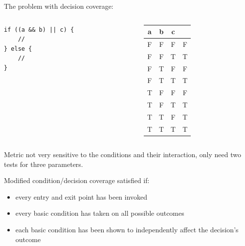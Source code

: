 \documentclass[xcolor = {dvipsnames, table}, aspectratio=169]{beamer}
\begin{document}
\newcommand \rowhl  {\rowcolor{Cyan!20}}
\newcommand \cellhl {\cellcolor{Cyan!20}}

\begin{frame}[fragile]
    The problem with decision coverage:
    \begin{columns}
        \begin{column}{0.5\textwidth}
            \begin{lstlisting}
if ((a && b) || c) {
    //
} else {
    //
}
            \end{lstlisting}
        \end{column}

        \begin{column}{0.5\textwidth}
            \begin{tabular}{c c c | c}
                        a & b & c \\
                        \hline
                \rowhl  F & F & F & F \\
                \rowhl  F & F & T & T \\
                        F & T & F & F \\
                        F & T & T & T \\
                        T & F & F & F \\
                        T & F & T & T \\
                        T & T & F & T \\
                        T & T & T & T \\
            \end{tabular}
        \end{column}
    \end{columns}

    \begin{block}{}
        Metric not very sensitive to the conditions and their interaction, only
        need two tests for three parameters.
    \end{block}
\end{frame}

\begin{frame}
    Modified condition/decision coverage satisfied if:
    \begin{itemize}
        \item every entry and exit point has been invoked
        \item every basic condition has taken on all possible outcomes
        \item each basic condition has been shown to independently affect the
              decision’s outcome
    \end{itemize}
\end{frame}
\end{document}
